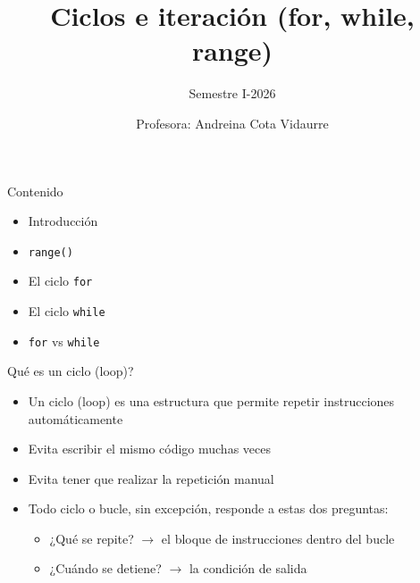 \documentclass{beamer}
\title{Ciclos e iteración (for, while, range)} %
\subtitle{Semestre I-2026} %
\author{Profesora: Andreina Cota Vidaurre}
\begin{document}
  \shorthandoff{-}
  \frame[c]{\maketitle}


    \begin{frame}{Contenido}
        \begin{itemize}
            \item Introducción
            \item \texttt{range()}
            \item El ciclo \texttt{for}
            \item El ciclo \texttt{while}
            \item \texttt{for} vs \texttt{while}
        \end{itemize}
    \end{frame}

    \begin{frame}{Qué es un ciclo (loop)?}
        \begin{itemize}
            \item Un ciclo (loop) es una estructura que permite repetir instrucciones automáticamente
            \item Evita escribir el mismo código muchas veces
            \item Evita tener que realizar la repetición manual
            \item Todo ciclo o bucle, sin excepción, responde a estas dos preguntas:
            \begin{itemize}
                \item ¿Qué se repite? $\rightarrow$ el bloque de instrucciones dentro del bucle
                \item ¿Cuándo se detiene? $\rightarrow$ la condición de salida
            \end{itemize}
        \end{itemize}
    \end{frame}
\end{document}
